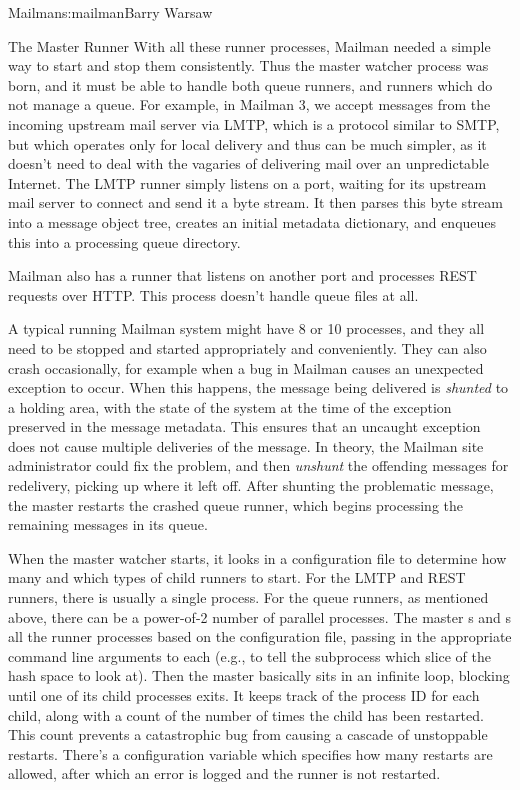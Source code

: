 \begin{aosachapter}{Mailman}{s:mailman}{Barry Warsaw}
\begin{aosasect1}{The Master Runner}
With all these runner processes, Mailman needed a simple way to start
and stop them consistently.  Thus the master watcher process was born,
and it must be able to handle both queue runners, and runners which do
not manage a queue.  For example, in Mailman 3, we accept messages
from the incoming upstream mail server via LMTP, which is a protocol
similar to SMTP, but which operates only for local delivery and thus
can be much simpler, as it doesn't need to deal with the vagaries of
delivering mail over an unpredictable Internet.  The LMTP runner
simply listens on a port, waiting for its upstream mail server to
connect and send it a byte stream.  It then parses this byte stream
into a message object tree, creates an initial metadata dictionary,
and enqueues this into a processing queue directory.

Mailman also has a runner that listens on another port and processes
REST requests over HTTP.  This process doesn't handle queue files at
all.

A typical running Mailman system might have 8 or 10 processes, and
they all need to be stopped and started appropriately and
conveniently.  They can also crash occasionally, for example when a
bug in Mailman causes an unexpected exception to occur.  When this
happens, the message being delivered is \emph{shunted} to a holding
area, with the state of the system at the time of the exception
preserved in the message metadata.  This ensures that an uncaught
exception does not cause multiple deliveries of the message.  In
theory, the Mailman site administrator could fix the problem, and then
\emph{unshunt} the offending messages for redelivery, picking up where
it left off.  After shunting the problematic message, the master
restarts the crashed queue runner, which begins processing the
remaining messages in its queue.

When the master watcher starts, it looks in a configuration file to
determine how many and which types of child runners to start.  For the
LMTP and REST runners, there is usually a single process.  For the
queue runners, as mentioned above, there can be a power-of-2 number of
parallel processes.  The master s and s all
the runner processes based on the configuration file, passing in the
appropriate command line arguments to each (e.g., to tell the
subprocess which slice of the hash space to look at).  Then the master
basically sits in an infinite loop, blocking until one of its child
processes exits.  It keeps track of the process ID for each child,
along with a count of the number of times the child has been
restarted.  This count prevents a catastrophic bug from causing a
cascade of unstoppable restarts.  There's a configuration variable
which specifies how many restarts are allowed, after which an error is
logged and the runner is not restarted.


\end{aosasect1}
\end{aosachapter}

